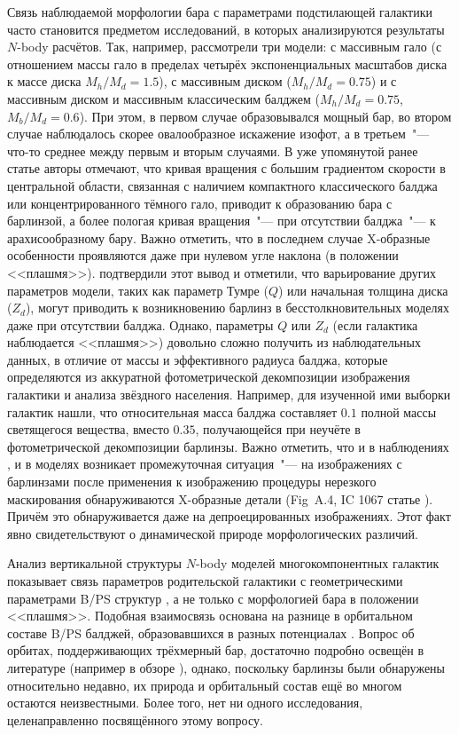 \documentclass{trlnotes}
\begin{document}
Связь наблюдаемой морфологии бара с параметрами подстилающей галактики часто становится предметом исследований, в которых анализируются результаты $N$-body расчётов. Так, например, \citet{athanassoula2002} рассмотрели три модели: с массивным гало (с отношением массы гало в пределах четырёх экспоненциальных масштабов диска к массе диска $M_h/M_d = 1.5$), с массивным диском ($M_h/M_d = 0.75$) и с массивным диском и массивным классическим балджем ($M_h/M_d = 0.75$, $M_b/M_d = 0.6$). При этом, в первом случае образовывался мощный бар, во втором случае наблюдалось скорее овалообразное искажение изофот, а в третьем~"--- что-то среднее между первым и вторым случаями. В уже упомянутой ранее статье \citet{salo2017} авторы отмечают, что кривая вращения с большим градиентом скорости в центральной области, связанная с наличием компактного классического балджа или концентрированного тёмного гало, приводит к образованию бара с барлинзой, а более пологая кривая вращения~"--- при отсутствии балджа~"--- к арахисообразному бару. Важно отметить, что в последнем случае X-образные особенности проявляются даже при нулевом угле наклона (в положении <<плашмя>>). \citet{smirnov2018} подтвердили этот вывод и отметили, что варьирование других параметров модели, таких как параметр Тумре ($Q$) или начальная толщина диска ($Z_d$), могут приводить к возникновению барлинз в бесстолкновительных моделях даже при отсутствии балджа. Однако, параметры $Q$ или $Z_d$ (если галактика наблюдается <<плашмя>>) довольно сложно получить из наблюдательных данных, в отличие от массы и эффективного радиуса балджа, которые определяются из аккуратной фотометрической декомпозиции изображения галактики и анализа звёздного населения. Например, \citet{laurikainen2014} для изученной ими выборки галактик нашли, что относительная масса балджа составляет $0.1$ полной массы светящегося вещества, вместо $0.35$, получающейся при неучёте в фотометрической декомпозиции барлинзы. Важно отметить, что и в наблюдениях \citep{laurikainen2017}, и в моделях \citep{salo2017} возникает промежуточная ситуация~"--- на изображениях с барлинзами после применения к изображению процедуры нерезкого маскирования обнаруживаются X-образные детали (Fig~A.4, IC 1067 статье \citealp{laurikainen2017}). Причём это обнаруживается даже на депроецированных изображениях. Этот факт явно свидетельствуют о динамической природе морфологических различий. 

Анализ вертикальной структуры $N$-body моделей многокомпонентных галактик показывает связь параметров родительской галактики с геометрическими параметрами B/PS структур \citep{smirnov2018}, а не только с морфологией бара в положении <<плашмя>>. Подобная взаимосвязь основана на разнице в орбитальном составе B/PS балджей, образовавшихся в разных потенциалах \citep{parul2020}. Вопрос об орбитах, поддерживающих трёхмерный бар, достаточно подробно освещён в литературе (например в обзоре \cite{athanassoula2016}), однако, поскольку барлинзы были обнаружены относительно недавно, их природа и орбитальный состав ещё во многом остаются неизвестными. Более того, нет ни одного исследования, целенаправленно посвящённого этому вопросу.
\end{document}
